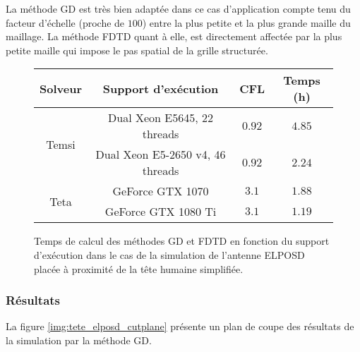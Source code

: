 La méthode GD est très bien adaptée dans ce cas d'application compte tenu du
facteur d'échelle (proche de $100$) entre la plus petite et la plus grande maille du maillage. La méthode FDTD quant à elle, est directement affectée par la plus petite
maille qui impose le pas spatial de la grille structurée.


\begin{figure}[!h]
	\begin{center}
		\caption{
			\label{tab:tete_elposd_times}
			Temps de calcul des méthodes GD et FDTD en fonction
			du support d'exécution dans le cas de la simulation de
			l'antenne ELPOSD placée à proximité de la tête humaine simplifiée.
		}
		
		\begin{tabular}{|c|c|c|c|}
			\hline
			Solveur & Support d'exécution & CFL & Temps (h) \\ \hline\hline
			\multirow{2}{*}{Temsi} & Dual Xeon E5645, 22 threads & $0.92$ & $4.85$ \\	\cline{2-4}
			& Dual Xeon E5-2650 v4, 46 threads & $0.92$ & $\bm{2.24}$ \\	\hline
			\multirow{2}{*}{Teta} & GeForce GTX 1070 & $3.1$ & $1.88$ \\	\cline{2-4}
			& GeForce GTX 1080 Ti & $3.1$ & $\bm{1.19}$ \\	\hline
		\end{tabular}
	\end{center}
\end{figure}


\subsubsection{Résultats}
\label{sssect:tete_simplifiee_comp_res}

La figure \ref{img:tete_elposd_cutplane} présente un plan de coupe
des résultats de la simulation par la méthode GD.


